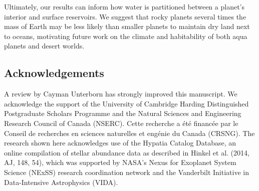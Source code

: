 

Ultimately, our results can inform how water is partitioned between a planet's interior and surface reservoirs. We suggest that rocky planets several times the mass of Earth may be less likely than smaller planets to maintain dry land next to oceans, motivating future work on the climate and habitability of both aqua planets and desert worlds.



\subsection*{Acknowledgements}

A review by Cayman Unterborn has strongly improved this manuscript. We acknowledge the support of the University of Cambridge Harding Distinguished Postgraduate Scholars Programme and the Natural Sciences and Engineering Research Council of Canada (NSERC). Cette recherche a \'et\'e financ\'ee par le Conseil de recherches en sciences naturelles et eng\'enie du Canada (CRSNG). The research shown here acknowledges use of the Hypatia Catalog Database, an online compilation of stellar abundance data as described in Hinkel et al. (2014, AJ, 148, 54), which was supported by NASA's Nexus for Exoplanet System Science (NExSS) research coordination network and the Vanderbilt Initiative in Data-Intensive Astrophysics (VIDA).

